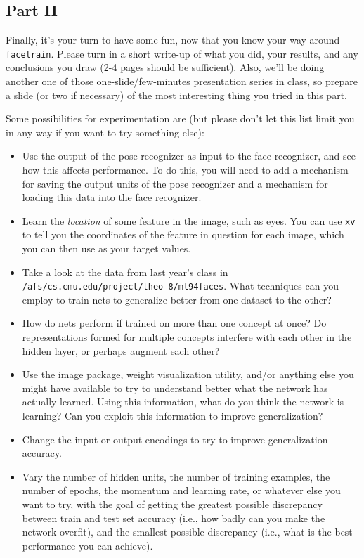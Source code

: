 \subsection{Part II}

Finally, it's your turn to have some fun, now that you know
your way around {\tt facetrain}.  Please turn in a short write-up
of what you did, your results, and any conclusions you draw (2-4
pages should be sufficient).
Also, we'll be doing another one of those one-slide/few-minutes
presentation series in class, so prepare a slide (or two if
necessary) of the most interesting thing you tried in this part.

Some possibilities for experimentation are (but please don't let
this list limit you in any way if you want to try something else):

\begin{itemize}

\item Use the output of the pose recognizer as input to the face
recognizer, and see how this affects performance.  To do this, you
will need to add a mechanism for saving the output units of the pose
recognizer and a mechanism for loading this data into the face
recognizer.

\item Learn the {\it location} of some feature in the image, such
as eyes.  You can use {\tt xv} to tell you the coordinates of the
feature in question for each image, which you can then use as your
target values.

\item Take a look at the data from last year's class in
{\tt /afs/cs.cmu.edu/project/theo-8/ml94faces}.  What techniques
can you employ to train nets to generalize better from one dataset
to the other?

\item How do nets perform if trained on more than one concept at once?
Do representations formed for multiple concepts interfere with each other
in the hidden layer, or perhaps augment each other?

\item Use the image package, weight visualization utility, and/or
anything else you might have
available to try to understand better what the network has actually learned.
Using this information, what do you think the network
is learning?  Can you exploit this information to improve generalization?

\item Change the input or output encodings to try to improve
generalization accuracy.

\item Vary the number of hidden units, the number of training examples,
the number of epochs, the momentum and learning rate, or whatever else you
want to try, with the goal of getting the greatest possible discrepancy
between train and test set accuracy (i.e., how badly can you make the
network overfit), and the smallest possible discrepancy (i.e., what is
the best performance you can achieve).

\end{itemize}

